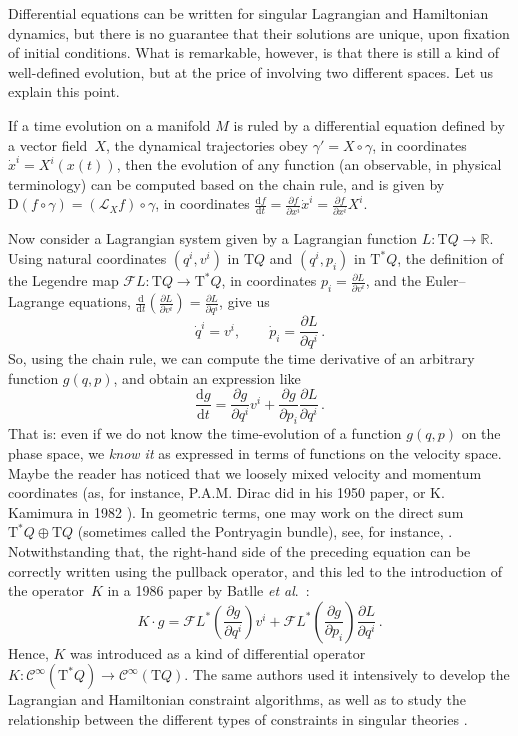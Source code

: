 \documentclass[11pt]{article}
\theoremstyle{plain}
\theoremstyle{definition}
\newcommand{\R}{\mathbb{R}}
\newcommand{\Cinfty}{\mathscr{C}^\infty}
\newcommand{\T}{{\mathrm T}}
\newcommand{\Lie}{\mathscr{L}}
\newcommand{\parder}[2]{\frac{\partial #1}{\partial #2}}
\def\Lie{\mathscr{L}}
\def\FL{\mathcal{F} L}
\newcommand{\totder}[2]{\frac{\mathrm{d} #1}{\mathrm{d} #2}}
\begin{document}
Differential equations can be written for singular Lagrangian and Hamiltonian dynamics, 
but there is no guarantee that their solutions are unique,
upon fixation of initial conditions.
What is remarkable, however, 
is that there is still a kind of well-defined evolution,
but at the price of involving two different spaces.
Let us explain this point.

If a time evolution on a manifold $M$ is ruled by a differential equation defined by a vector field~$X$,
the dynamical trajectories obey
$\gamma' = X \circ \gamma$,
in coordinates $\dot x^i = X^i(x(t))$,
then the evolution of any function
(an observable, in physical terminology) 
can be computed based on the chain rule,
and is given by $\mathrm{D}(f \circ \gamma) = (\Lie_X f) \circ \gamma$,
in coordinates
$
\totder{f}{t} = 
\parder{f}{x^i} \dot x^i = \parder{f}{x^i} X^i
$.

Now consider a Lagrangian system given by a Lagrangian function $L \colon \T Q \to \R$.
Using natural coordinates $(q^i,v^i)$ in $\T Q$ and
$(q^i,p_i)$ in $\T^*Q$,
the definition of the Legendre map
$\FL \colon \T Q \to \T^*Q$,
in coordinates
$p_i = \parder{L}{v^i}$,
and the Euler--Lagrange equations,
$
\totder{}{t} \left( \parder{L}{v^i} \right) = \parder{L}{q^i}
$,
give us 
$$
\dot q^i = v^i ,
\qquad 
\dot p_i = \parder{L}{q^i}
\,.
$$
So, using the chain rule, we can compute the time derivative of an arbitrary function $g(q,p)$,
and obtain an expression like
$$
\totder{g}{t} = 
\parder{g}{q^i} v^i +
\parder{g}{p_i} \parder{L}{q^i}
\,.
$$
That is: 
even if we do not know the time-evolution of a function
$g(q,p)$ on the phase space,
we \emph{know it} as expressed in terms of functions 
on the velocity space.
Maybe the reader has noticed that we loosely mixed 
velocity and momentum coordinates
(as, for instance, P.A.M. Dirac did in his 1950 paper,
or K. Kamimura in 1982
\cite{Kam_82}).
In geometric terms, one may work on the direct sum 
$\T^*Q \oplus \T Q$
(sometimes called the Pontryagin bundle),
see, for instance, 
\cite{Ski_83}.
Notwithstanding that,
the right-hand side of the preceding equation can be correctly written using the pullback operator,
and this led to the introduction of the operator~$K$  
in a 1986 paper by Batlle \textit{et al}.\
\cite{BGPR_86}:
$$
K \cdot g = 
\FL^*\left(\parder{g}{q^i}\right) v^i +
\FL^*\left(\parder{g}{p_i}\right) \parder{L}{q^i}
\,.
$$
Hence, $K$ was introduced as a kind of differential operator $K \colon \Cinfty(\T^*Q) \to \Cinfty(\T Q)$.
The same authors used it intensively
to develop the Lagrangian and Hamiltonian constraint algorithms, as well as 
to study the relationship between the different types of constraints in singular theories \cite{BGPR_86,BGPR_87,Pon_88}.
\end{document}
